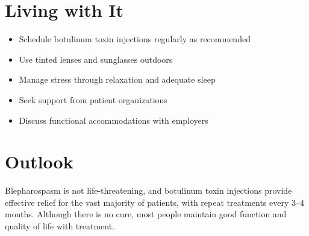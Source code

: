\section{Living with It}
\begin{itemize}[noitemsep]
  \item Schedule botulinum toxin injections regularly as recommended
  \item Use tinted lenses and sunglasses outdoors
  \item Manage stress through relaxation and adequate sleep
  \item Seek support from patient organizations
  \item Discuss functional accommodations with employers
\end{itemize}
\section{Outlook}
Blepharospasm is not life-threatening, and botulinum toxin injections provide effective relief for the vast majority of patients, with repeat treatments every 3--4 months. Although there is no cure, most people maintain good function and quality of life with treatment.
